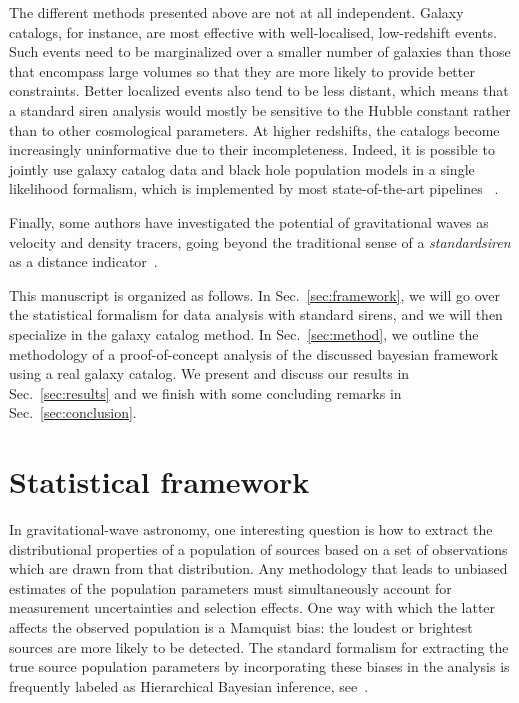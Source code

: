 \documentclass[%
preprint,
nofootinbib,
 amsmath,amssymb,
 aps,
]{revtex4-2}
\begin{document}
The different methods presented above are not at all independent. Galaxy catalogs, for instance,
are most effective with well-localised, low-redshift events. Such events need to be marginalized
over a smaller number of galaxies than those that encompass large volumes so that they are more
likely to provide better constraints. Better localized events also tend to be less distant, which
means that a standard siren analysis would mostly be sensitive to the Hubble constant rather than
to other cosmological parameters. At higher redshifts, the catalogs become increasingly
uninformative due to their incompleteness. Indeed, it is possible to jointly use galaxy catalog
data and black hole population models in a single likelihood formalism, which is implemented by
most state-of-the-art pipelines ~\cite{Mastrogiovanni:2023emh,gray2023joint,borghi_cosmology_2023}.

Finally, some authors have investigated the potential of gravitational waves as velocity and
density tracers, going beyond the traditional sense of a \textit{standardsiren} as a distance
indicator~\cite{Palmese_2021,Alfradique:2022tox}.

This manuscript is organized as follows. In Sec.~\ref{sec:framework}, we will go over the
statistical formalism for data analysis with standard sirens, and we will then specialize in the
galaxy catalog method. In Sec.~\ref{sec:method}, we outline the methodology of a proof-of-concept
analysis of the discussed bayesian framework using a real galaxy catalog. We present and discuss
our results in Sec.~\ref{sec:results} and we finish with some concluding remarks in
Sec.~\ref{sec:conclusion}.

\section{\label{sec:framework}Statistical framework}

In gravitational-wave astronomy, one interesting question is how to extract the distributional
properties of a population of sources based on a set of observations which are drawn from that
distribution. Any methodology that leads to unbiased estimates of the population parameters must
simultaneously account for measurement uncertainties and selection effects. One way with which the
latter affects the observed population is a Mamquist bias: the loudest or brightest sources are
more likely to be detected. The standard formalism for extracting the true source population
parameters by incorporating these biases in the analysis is frequently labeled as Hierarchical
Bayesian inference, see~\cite{Loredo:2004nn,Mandel:2018mve,Vitale_2021}.
\end{document}
